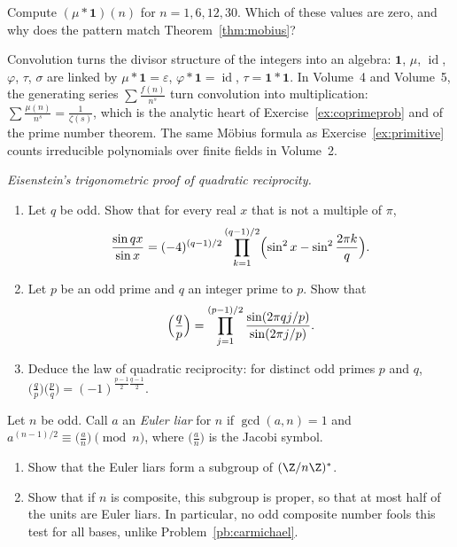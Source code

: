 \begin{exercise}[$\star$]\label{ex:t1-mu12}
Compute $(\mu*\mathbf 1)(n)$ for $n=1,6,12,30$. Which of these values are zero, and why does the pattern match Theorem~\ref{thm:mobius}?
\end{exercise}

\begin{beauty}
Convolution turns the divisor structure of the integers into an algebra: $\mathbf 1$, $\mu$, $\operatorname{id}$, $\varphi$, $\tau$, $\sigma$ are linked by $\mu*\mathbf 1=\varepsilon$, $\varphi*\mathbf 1=\operatorname{id}$, $\tau=\mathbf 1*\mathbf 1$. In Volume~4 and Volume~5, the generating series $\sum\frac{f(n)}{n^s}$ turn convolution into multiplication: $\sum\frac{\mu(n)}{n^s}=\frac1{\zeta(s)}$, which is the analytic heart of Exercise~\ref{ex:coprimeprob} and of the prime number theorem. The same M\"obius formula as Exercise~\ref{ex:primitive} counts irreducible polynomials over finite fields in Volume~2.
\end{beauty}

\begin{exercise}[Journey]\label{pb:eisensine}
\emph{Eisenstein's trigonometric proof of quadratic reciprocity.}
\begin{enumerate}[label=(\alph*)]
\item Let $q$ be odd. Show that for every real $x$ that is not a multiple of $\pi$,
\[
\frac{\sin qx}{\sin x}=(-4)^{(q-1)/2}\prod_{k=1}^{(q-1)/2}\Bigl(\sin^2x-\sin^2\frac{2\pi k}q\Bigr).
\]
\item Let $p$ be an odd prime and $q$ an integer prime to $p$. Show that
\[
\Bigl(\frac qp\Bigr)=\prod_{j=1}^{(p-1)/2}\frac{\sin(2\pi qj/p)}{\sin(2\pi j/p)}.
\]
\item Deduce the law of quadratic reciprocity: for distinct odd primes $p$ and $q$,
$\bigl(\frac qp\bigr)\bigl(\frac pq\bigr)=(-1)^{\frac{p-1}2\frac{q-1}2}$.
\end{enumerate}
\end{exercise}

\begin{exercise}[$\star\star$]\label{pb:euler}
Let $n$ be odd. Call $a$ an \emph{Euler liar} for $n$ if $\gcd(a,n)=1$ and $a^{(n-1)/2}\equiv\bigl(\frac an\bigr)\pmod n$, where
$\bigl(\frac an\bigr)$ is the Jacobi symbol.
\begin{enumerate}[label=(\alph*)]
\item Show that the Euler liars form a subgroup of $(\Z/n\Z)^*$.
\item Show that if $n$ is composite, this subgroup is proper, so that at most half of the units are Euler liars. In
particular, no odd composite number fools this test for all bases, unlike Problem~\ref{pb:carmichael}.
\end{enumerate}
\end{exercise}

